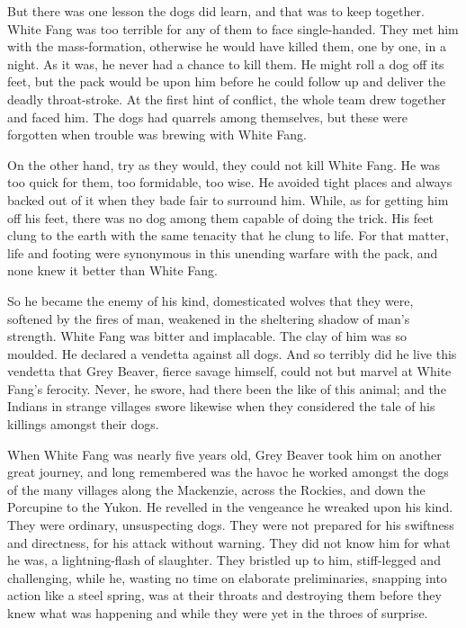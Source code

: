 \documentclass[10pt]{book}
\begin{document}
But there was one lesson the dogs did learn, and that was to keep
together. White Fang was too terrible for any of them to face
single-handed. They met him with the mass-formation, otherwise he would
have killed them, one by one, in a night. As it was, he never had a
chance to kill them. He might roll a dog off its feet, but the pack
would be upon him before he could follow up and deliver the deadly
throat-stroke. At the first hint of conflict, the whole team drew
together and faced him. The dogs had quarrels among themselves, but
these were forgotten when trouble was brewing with White Fang.

On the other hand, try as they would, they could not kill White Fang.
He was too quick for them, too formidable, too wise. He avoided tight
places and always backed out of it when they bade fair to surround him.
While, as for getting him off his feet, there was no dog among them
capable of doing the trick. His feet clung to the earth with the same
tenacity that he clung to life. For that matter, life and footing were
synonymous in this unending warfare with the pack, and none knew it
better than White Fang.

So he became the enemy of his kind, domesticated wolves that they were,
softened by the fires of man, weakened in the sheltering shadow of
man’s strength. White Fang was bitter and implacable. The clay of him
was so moulded. He declared a vendetta against all dogs. And so
terribly did he live this vendetta that Grey Beaver, fierce savage
himself, could not but marvel at White Fang’s ferocity. Never, he
swore, had there been the like of this animal; and the Indians in
strange villages swore likewise when they considered the tale of his
killings amongst their dogs.

When White Fang was nearly five years old, Grey Beaver took him on
another great journey, and long remembered was the havoc he worked
amongst the dogs of the many villages along the Mackenzie, across the
Rockies, and down the Porcupine to the Yukon. He revelled in the
vengeance he wreaked upon his kind. They were ordinary, unsuspecting
dogs. They were not prepared for his swiftness and directness, for his
attack without warning. They did not know him for what he was, a
lightning-flash of slaughter. They bristled up to him, stiff-legged and
challenging, while he, wasting no time on elaborate preliminaries,
snapping into action like a steel spring, was at their throats and
destroying them before they knew what was happening and while they were
yet in the throes of surprise.
\end{document}
